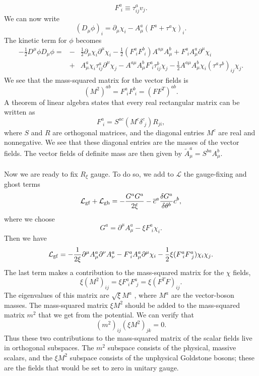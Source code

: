 \[F^a_{\phantom{i}i} \equiv \tau^a_{ij}v_j.\]
We can now write
\[(D_{\mu}\phi)_i = \partial_{\mu}\chi_i - A^a_{\mu}(F^a+\tau^a\chi)_i.\]
The kinetic term for $\phi$ becomes
\begin{eqnarray}
-\frac{1}{2}D^{\mu}\phi D_{\mu}\phi = &-& \frac{1}{2}\partial_{\mu}\chi_i \partial^{\mu}\chi_i - \frac{1}{2}(F^a_{\phantom{i}i} F^b_{\phantom{i}i})A^{a\mu}A^b_{\mu} + F^a_{\phantom{i}i} A^a_{\mu}\partial^{\mu}\chi_i \nonumber \\
&+& A^a_{\mu}\chi_i \tau^a_{ij}\partial^{\mu}\chi_j - A^{a\mu}A^b_{\mu} F^a_{\phantom{i}i} \tau^b_{ij} \chi_j - \frac{1}{2}A^{a\mu}A^b_{\mu}\chi_i (\tau^a \tau^b)_{ij}\chi_j .\nonumber
\end{eqnarray}
We see that the mass-squared matrix for the vector fields is
\[(M^2)^{ab} = F^a_{\phantom{i}i} F^b_{\phantom{i}i} = (FF^T)^{ab}.\]
A theorem of linear algebra states that every real rectangular matrix can be written as
\[F^a_{\phantom{i}i} = S^{ac}(M^c\delta^c_{\phantom{i}j})R_{ji},\]
where $S$ and $R$ are orthogonal matrices, and the diagonal entries $M^c$ are real and nonnegative. We see that these diagonal entries are the masses of the vector fields. The vector fields of definite mass are then given by $\widetilde{A}^{a}_{\mu} = S^{ba}A^b_{\mu}$.
\\ \\
Now we are ready to fix $R_{\xi}$ gauge. To do so, we add to $\mathcal{L}$ the gauge-fixing and ghost terms
\[\mathcal{L}_{\rm gf} + \mathcal{L}_{\rm gh} = - \frac{G^aG^a}{2\xi} - \overline{c}^a\frac{\delta G^a}{\delta \theta^b} c^b ,\]
where we choose
\[G^a = \partial^{\mu}A^a_{\mu} - \xi F^a_{\phantom{i}i} 
\chi_i.\]
Then we have
\[\mathcal{L}_{\rm gf} = -\frac{1}{2\xi} \partial^{\mu}A^a_{\mu} \partial^{\nu}A^a_{\nu} - F^a_{\phantom{i}i} A^a_{\mu}\partial^{\mu}\chi_i - \frac{1}{2}\xi (F^a_{\phantom{i}i} F^a_{\phantom{i}j})\chi_i\chi_j.\]
The last term makes a contribution to the mass-squared matrix for the $\chi$ fields,
\[\xi(M^2)_{ij} = \xi F^a_{\phantom{i}i} F^a_{\phantom{i}j} = \xi(F^TF)_{ij}.\]
The eigenvalues of this matrix are $\sqrt{\xi}M^a$ , where
$M^a$ are the vector-boson masses. The mass-squared matrix $\xi M^2$ should be added to the mass-squared matrix $m^2$ that we get from the potential. We can verify that
\[(m^2)_{ij}(\xi M^2)_{jk} = 0.\]
Thus these two contributions to the mass-squared matrix of the scalar fields live in orthogonal subspaces. The $m^2$ subspace consists of the physical, massive scalars, and the $\xi M^2$ subspace consists of the unphysical Goldstone bosons; these are the fields that would be set to zero in unitary gauge.
